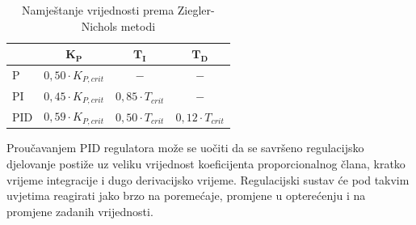 \documentclass[times, utf8, diplomski]{fer}
\begin{document}
\begin{table}[htb]
\caption{Namještanje vrijednosti prema Ziegler-Nichols metodi}
\label{tbl:konstantePID}
\centering
\begin{tabular}{lccc} \toprule
& $\mathbf{K_P}$ & $\mathbf{T_I}$ & $\mathbf{T_D}$\\ \midrule
P & $0,50\cdot K_{P,crit}$ & $-$ & $-$ \\
PI & $0,45\cdot K_{P,crit}$ & $0,85\cdot T_{crit}$ & $-$ \\
PID & $0,59\cdot K_{P,crit}$ & $0,50\cdot T_{crit}$ & $0,12\cdot T_{crit}$ \\ \bottomrule
\end{tabular}
\end{table}
Proučavanjem PID regulatora može se uočiti da se savršeno regulacijsko djelovanje postiže uz veliku vrijednost koeficijenta proporcionalnog člana, kratko vrijeme integracije i dugo derivacijsko vrijeme. Regulacijski sustav će pod takvim uvjetima reagirati jako brzo na poremećaje, promjene u opterećenju i na promjene zadanih vrijednosti.
\end{document}
